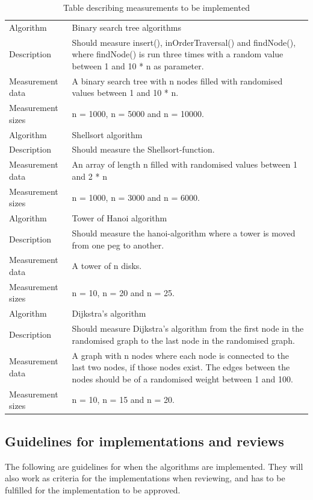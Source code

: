 \documentclass {article}
\begin{document}
\begin{table}[H]
\caption{Table describing measurements to be implemented}
\begin{tabular}{ | l p{10cm} | }
\hline
Algorithm & Binary search tree algorithms \\
Description & Should measure insert(), inOrderTraversal() and findNode(), where findNode() is run three times with a random value between 1 and 10 * n as parameter. \\
Measurement data & A binary search tree with n nodes filled with randomised values between 1 and 10 * n. \\ 
Measurement sizes & n = 1000, n = 5000 and n = 10000. \\
\hline
Algorithm & Shellsort algorithm \\
Description & Should measure the Shellsort-function.\\
Measurement data & An array of length n filled with randomised values between 1 and 2 * n \\ 
Measurement sizes & n = 1000, n = 3000 and n = 6000. \\
\hline
Algorithm & Tower of Hanoi algorithm \\
Description & Should measure the hanoi-algorithm where a tower is moved from one peg to another. \\
Measurement data & A tower of n disks. \\ 
Measurement sizes & n = 10, n = 20 and n = 25. \\
\hline
Algorithm & Dijkstra's algorithm \\
Description & Should measure Dijkstra's algorithm from the first node in the randomised graph to the last node in the randomised graph.\\
Measurement data & A graph with n nodes where each node is connected to the last two nodes, if those nodes exist. The edges between the nodes should be of a randomised weight between 1 and 100.\\ 
Measurement sizes & n = 10, n = 15 and n = 20. \\
\hline
\end{tabular}
\label{tab:measurements}
\end{table}
\subsection{Guidelines for implementations and reviews}
\label{sec:guidelines}
The following are guidelines for when the algorithms are implemented. They will also work as criteria for the implementations when reviewing, and has to be fulfilled for the implementation to be approved.
\label{sec:paradigm-guidelines}
\end{document}
